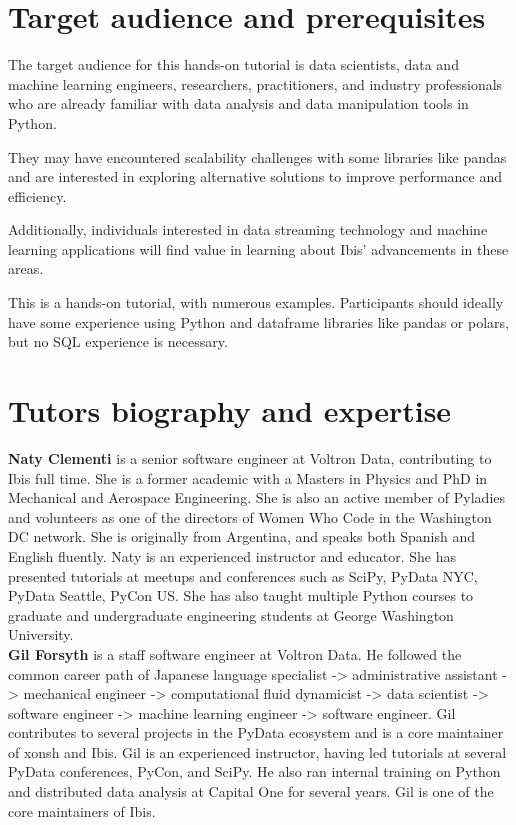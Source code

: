 \documentclass[sigconf]{acmart}
\begin{document}
\section{Target audience and prerequisites}
The target audience for this hands-on tutorial is data scientists, data and machine
learning engineers, researchers, practitioners, and industry professionals who are 
already familiar with data analysis and data manipulation tools in Python. 

They may have encountered scalability challenges with some libraries like pandas 
and are interested in exploring alternative solutions to improve performance and
efficiency.

Additionally, individuals interested in data streaming technology and machine 
learning applications will find value in learning about Ibis' advancements in 
these areas. 

This is a hands-on tutorial, with numerous examples. Participants should ideally
have some experience using Python and dataframe libraries like pandas or polars,
but no SQL experience is necessary.


\section{Tutors biography and expertise}

\textbf{Naty Clementi} is a senior software engineer at Voltron Data, contributing to
Ibis full time. She is a former academic with a Masters in Physics and PhD in
Mechanical and Aerospace Engineering. She is also an active member of Pyladies
and volunteers as one of the directors of Women Who Code in the Washington DC
network. She is originally from Argentina, and speaks both Spanish and English
fluently. Naty is an experienced instructor and educator. She has presented
tutorials at meetups and conferences such as SciPy, PyData NYC, PyData Seattle,
PyCon US. She has also taught multiple Python courses to graduate and
undergraduate engineering students at George Washington University. \\ 



\textbf{Gil Forsyth} is a staff software engineer at Voltron Data. He followed the common
career path of Japanese language specialist -> administrative assistant ->
mechanical engineer -> computational fluid dynamicist -> data scientist ->
software engineer -> machine learning engineer -> software engineer. Gil
contributes to several projects in the PyData ecosystem and is a core maintainer
of xonsh and Ibis. Gil is an experienced instructor, having led tutorials at
several PyData conferences, PyCon, and SciPy. He also ran internal training on
Python and distributed data analysis at Capital One for several years. Gil is
one of the core maintainers of Ibis. \\ 
\end{document}
